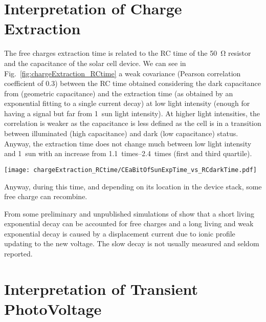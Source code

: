 \section{Interpretation of Charge Extraction}\label{interpretation_ce}
The free charges extraction time is related to the RC time of the \SI{50}{\ohm} resistor and the capacitance of the solar cell device. We can see in Fig.~\ref{fig:chargeExtraction_RCtime} a weak covariance (Pearson correlation coefficient of 0.3) between the RC time obtained considering the dark capacitance from  (geometric capacitance) and the extraction time (as obtained by an exponential fitting to a single  current decay) at low light intensity (enough for having a signal but far from 1~sun light intensity). At higher light intensities, the correlation is weaker as the capacitance is less defined as the cell is in a transition between illuminated (high capacitance) and dark (low capacitance) status. Anyway, the extraction time does not change much between low light intensity and 1~sun with an increase from \SIrange{1.1}{2.4}{times} (first and third quartile).

\begin{SCfigure}%
	\centering
	\texttt{[image: chargeExtraction\_RCtime/CEaBitOfSunExpTime\_vs\_RCdarkTime.pdf]}
	\label{fig:chargeExtraction_RCtime}
\end{SCfigure}

Anyway, during this time, and depending on its location in the device stack, some free charge can recombine.

From some preliminary and unpublished simulations of  show that a short living exponential decay can be accounted for free charges and a long living and weak exponential decay is caused by a displacement current due to ionic profile updating to the new voltage. The slow decay is not usually measured and seldom reported\cite{ORegan2015b}.



\section{Interpretation of Transient PhotoVoltage}\label{interpretation_tpv}

